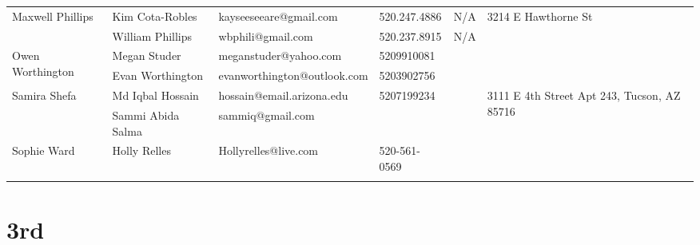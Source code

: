 \documentclass[landscape]{article}\usepackage[]{graphicx}\usepackage[]{color}
\begin{document}
\begin{longtable}{|p{100pt}|p{100pt}|p{140pt}|p{60pt}|p{64pt}|p{120pt}|}
\hline
\multirow{2}{100pt}{Maxwell Phillips} & Kim Cota-Robles & kayseeseeare@gmail.com & 520.247.4886 & N/A & \multirow{2}{120pt}{3214 E Hawthorne St} \\
 & William Phillips & wbphili@gmail.com & 520.237.8915 & N/A & \\
\hline
\multirow{2}{100pt}{Owen Worthington} & Megan Studer & meganstuder@yahoo.com & 5209910081 &  & \multirow{2}{120pt}{} \\
 & Evan Worthington & evanworthington@outlook.com & 5203902756 &  & \\
\hline
\multirow{2}{100pt}{Samira Shefa} & Md Iqbal Hossain & hossain@email.arizona.edu & 5207199234 &  & \multirow{2}{120pt}{3111 E 4th Street Apt 243, Tucson, AZ 85716} \\
 & Sammi Abida Salma & sammiq@gmail.com &  &  & \\
\hline
\multirow{2}{100pt}{Sophie Ward} & Holly Relles & Hollyrelles@live.com & 520-561-0569 &  & \multirow{2}{120pt}{} \\
 &  &  &  &  & \\
\hline
\end{longtable}
\newpage
\section{3rd}
\end{document}
